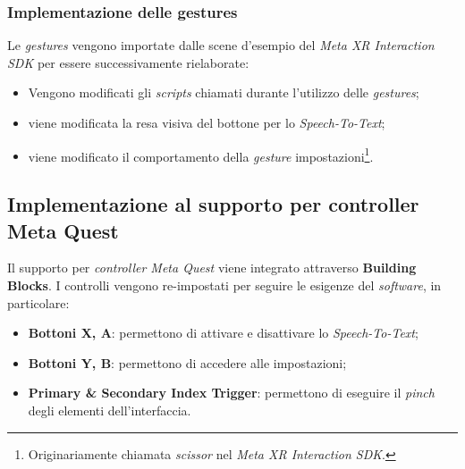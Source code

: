 \documentclass[12pt, a4paper]{article}
\begin{document}
            \subsubsection{Implementazione delle gestures}
                Le \textit{gestures} vengono importate dalle scene d'esempio del 
                \textit{Meta XR Interaction SDK} per essere successivamente rielaborate:
                \begin{itemize}
                    \item Vengono modificati gli \textit{scripts} chiamati durante 
                    l'utilizzo delle \textit{gestures};
                    \item viene modificata la resa visiva del bottone per lo 
                    \textit{Speech-To-Text};
                    \item viene modificato il comportamento della \textit{gesture} 
                    impostazioni\footnote{Originariamente chiamata \textit{scissor} 
                    nel \textit{Meta XR Interaction SDK}.}.
                \end{itemize}
    \subsection{Implementazione al supporto per controller Meta Quest}
        Il supporto per \textit{controller Meta Quest} viene integrato attraverso 
        \textbf{Building Blocks}. I controlli vengono re-impostati per seguire le esigenze 
        del \textit{software}, in particolare: 
        \begin{itemize}
            \item \textbf{Bottoni X, A}: permettono di attivare e disattivare lo 
            \textit{Speech-To-Text};
            \item \textbf{Bottoni Y, B}: permettono di accedere alle impostazioni;
            \item \textbf{Primary \& Secondary Index Trigger}: permettono di eseguire il 
            \textit{pinch} degli elementi dell'interfaccia.
        \end{itemize}
\end{document}
